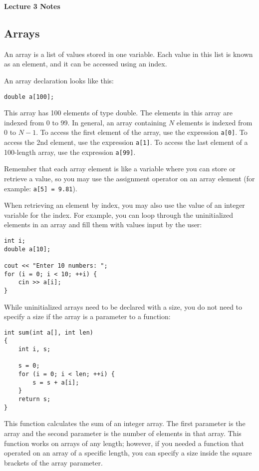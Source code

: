 \documentclass[a4paper,12pt]{article}
\begin{document}
\lstset{frame=single,tabsize=4,basicstyle=\ttfamily}

{\centering \bf \Large
Lecture 3 Notes \\[\baselineskip]
}

\subsection*{Arrays}

An array is a list of values stored in one variable. Each value in this list is known as an element, and it can be accessed using an index. 

An array declaration looks like this:

\begin{lstlisting}
double a[100];
\end{lstlisting}

This array has 100 elements of type double. The elements in this array are indexed from 0 to 99. In general, an array containing $N$ elements is indexed from $0$ to $N - 1$. To access the first element of the array, use the expression \texttt{a[0]}. To access the 2nd element, use the expression \texttt{a[1]}. To access the last element of a 100-length array, use the expression \texttt{a[99]}.

Remember that each array element is like a variable where you can store or retrieve a value, so you may use the assignment operator on an array element (for example: \texttt{a[5] = 9.81}). 

When retrieving an element by index, you may also use the value of an integer variable for the index. For example, you can loop through the uninitialized elements in an array and fill them with values input by the user:

\begin{lstlisting}
int i;
double a[10];

cout << "Enter 10 numbers: ";
for (i = 0; i < 10; ++i) {
	cin >> a[i];
}
\end{lstlisting}

While uninitialized arrays need to be declared with a size, you do not need to specify a size if the array is a parameter to a function:

\begin{lstlisting}
int sum(int a[], int len)
{
	int i, s;

	s = 0;
	for (i = 0; i < len; ++i) {
		s = s + a[i];
	}
	return s;
}
\end{lstlisting}

This function calculates the sum of an integer array. The first parameter is the array and the second parameter is the number of elements in that array. This function works on arrays of any length; however, if you needed a function that operated on an array of a specific length, you can specify a size inside the square brackets of the array parameter.
\end{document}
